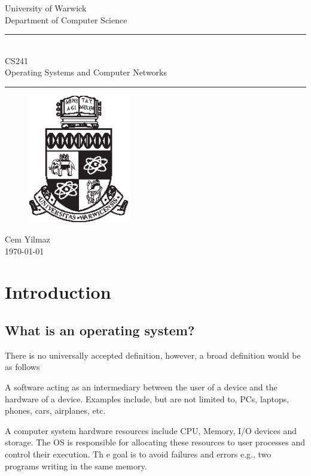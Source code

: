 \documentclass[a4paper]{article}
\theoremstyle{plain}
\theoremstyle{definition}
\newtheorem{defn}{Definition}[section]
\theoremstyle{remark}
\begin{document}
	\begin{titlepage}
	\begin{center}
	\large
	University of Warwick \\
	Department of Computer Science \\
	\huge
	\vspace{50mm}
	\rule{\linewidth}{0.5pt} \\
	CS241 \\
	\vspace{5mm}
	\Large
	Operating Systems and Computer Networks
	\rule{\linewidth}{0.5pt}
	\vspace{5mm}
	\begin{figure}[H]
	\centering
	\includegraphics[width=0.4\textwidth]{crest_black.eps}
	\end{figure}
	\vspace{37mm}
	Cem Yilmaz \\
	\today
	\end{center}
	\end{titlepage}
	\tableofcontents
	\newpage
	\section{Introduction}
	\subsection{What is an operating system?}
	There is no universally accepted definition, however, a broad definition would be as follows
	\begin{tcolorbox}[colback=black!3!white,colframe=black!60!white,title=\begin{defn}Operating system \label{Operating system}\end{defn}]
	A software acting as an intermediary between the user of a device and the hardware of a device. Examples include, but are not limited to, PCs, laptops, phones, cars, airplanes, etc.
	\end{tcolorbox}
	A computer system hardware resources include CPU, Memory, I/O devices and storage. The OS is responsible for allocating these resources to user processes and control their execution. Th e goal is to avoid failures and errors e.g., two programs writing in the same memory.
\end{document}
